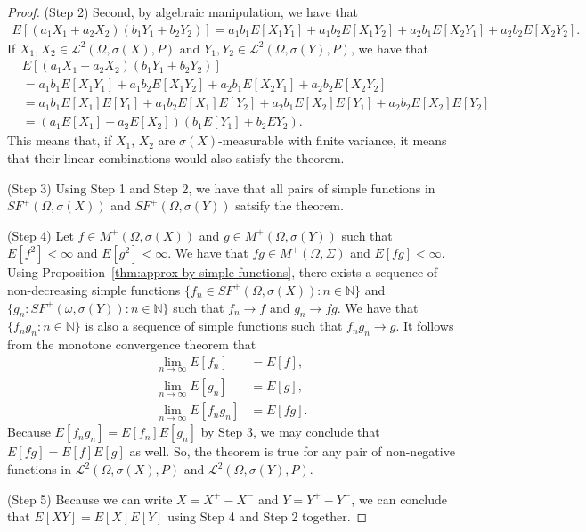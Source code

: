 \documentclass[10pt]{article}
\numberwithin{lemma}{section}
\newcommand{\mcal}[1]{\mathcal{#1}}
\newcommand{\Nat}{\mathbb{N}}
\begin{document}
\begin{itemize}
\begin{proof}
    (Step 2) Second, by algebraic manipulation, we have that
    \begin{align*}
      E[(a_1 X_1 + a_2 X_2)(b_1 Y_1 + b_2 Y_2)] = a_1 b_1 E[X_1 Y_1] + a_1 b_2 E[X_1 Y_2] + a_2 b_1 E[X_2 Y_1] + a_2 b_2 E[X_2 Y_2].
    \end{align*}
    If $X_1, X_2 \in \mcal{L}^2(\Omega, \sigma(X), P)$ and $Y_1, Y_2 \in \mcal{L}^2(\Omega,\sigma(Y), P)$, we have that
    \begin{align*}
      & E[(a_1 X_1 + a_2 X_2)(b_1 Y_1 + b_2 Y_2)] \\
      &= a_1 b_1 E[X_1 Y_1] + a_1 b_2 E[X_1 Y_2] + a_2 b_1 E[X_2 Y_1] + a_2 b_2 E[X_2 Y_2] \\
      &= a_1 b_1 E[X_1] E[Y_1] + a_1 b_2 E[X_1] E[Y_2] + a_2 b_1 E[X_2] E[Y_1] + a_2 b_2 E[X_2] E[Y_2] \\
      &= (a_1 E[X_1] + a_2 E[X_2])(b_1 E[Y_1] + b_2 E{Y_2}).
    \end{align*}
    This means that, if $X_1$, $X_2$ are $\sigma(X)$-measurable with finite variance, it means that their linear combinations would also satisfy the theorem.

    (Step 3) Using Step 1 and Step 2, we have that all pairs of simple functions in $SF^+(\Omega, \sigma(X))$ and $SF^+(\Omega, \sigma(Y))$ satsify the theorem.

    (Step 4) Let $f \in M^+(\Omega, \sigma(X))$ and $g \in M^+(\Omega, \sigma(Y))$ such that $E[f^2] < \infty$ and $E[g^2] < \infty$. We have that $fg \in M^+(\Omega,\Sigma)$ and $E[fg] < \infty$. Using Proposition~\ref{thm:approx-by-simple-functions}, there exists a sequence of non-decreasing simple functions $\{ f_n \in SF^+(\Omega,\sigma(X)): n \in \Nat \}$ and $\{ g_n : SF^+(\omega,\sigma(Y)) : n \in \Nat \}$ such that $f_n \rightarrow f$ and $g_n \rightarrow fg$. We have that $\{ f_n g_n : n \in \Nat \}$ is also a sequence of simple functions such that $f_n g_n \rightarrow g$. It follows from the monotone convergence theorem that
    \begin{align*}
      \lim_{n \rightarrow \infty} E[f_n] &= E[f], \\
      \lim_{n \rightarrow \infty} E[g_n] &= E[g], \\
      \lim_{n \rightarrow \infty} E[f_n g_n] &= E[f g]. 
    \end{align*}
    Because $E[f_n g_n] = E[f_n] E[g_n]$ by Step 3, we may conclude that $E[fg] = E[f]E[g]$ as well. So, the theorem is true for any pair of non-negative functions in $\mcal{L}^2(\Omega, \sigma(X), P)$ and $\mcal{L}^2(\Omega, \sigma(Y), P)$.

    (Step 5) Because we can write $X = X^+ - X^-$ and $Y = Y^+ - Y^-$, we can conclude that $E[XY] = E[X]E[Y]$ using Step 4 and Step 2 together.
  \end{proof}
\end{itemize}
\end{document}

